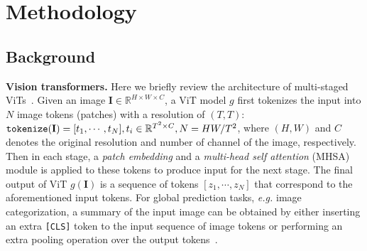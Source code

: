 \documentclass{article} \usepackage{iclr2022_conference,times}
\renewcommand{\paragraph}[1]{\noindent\textbf{#1.}}
\newcommand{\image}{\mathbf{I}}
\begin{document}
\vspace{-10pt}
\section{Methodology} 
\label{sec:method}
\vspace{-8pt}
\subsection{Background}
\vspace{-5pt}
\label{sec:overview}
\paragraph{Vision transformers} 
Here we briefly review the architecture of multi-staged ViTs~\citep{vit}. Given an image $\image \in \mathbb{R}^{H\times W\times C}$, a ViT model $g$ first tokenizes the input into $N$ image tokens (patches) with a resolution of $(T, T)$: $\text{\texttt{tokenize}}(\image) = [t_1, \cdots, t_{N}], t_{i}\in \mathbb{R}^{T^2\times C}, N=HW/T^2$, where $(H, W)$ and $C$ denotes the original resolution and number of channel of the image, respectively. Then in each stage, a \emph{patch embedding} and a \emph{multi-head self attention} (MHSA) module is applied to these tokens to produce input for the next stage. 
The final output of ViT $g(\image)$ is a sequence of tokens $[z_1, \cdots, z_N]$ that correspond to the aforementioned input tokens. 
For global prediction tasks, \emph{e.g.} image categorization, a summary of the input image can be obtained by either inserting an extra \texttt{[CLS]} token to the input sequence of image tokens or performing an extra pooling operation over the output tokens~\citep{zhai2021scaling}. 
\end{document}
